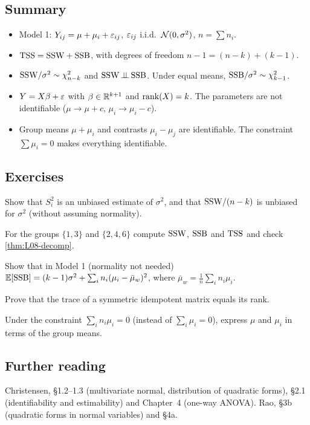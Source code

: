 \subsection{Summary}
\begin{itemize}
  \item Model 1: $Y_{ij}=\mu+\mu_i+\varepsilon_{ij}$, $\varepsilon_{ij}$ i.i.d.\ $\mathcal N(0,\sigma^2)$, $n=\sum n_i$.
  \item $\mathrm{TSS}=\mathrm{SSW}+\mathrm{SSB}$, with degrees of freedom $n-1=(n-k)+(k-1)$.
  \item $\mathrm{SSW}/\sigma^2\sim\chi^2_{n-k}$ and $\mathrm{SSW}\operatorname{\perp\!\!\!\perp}\mathrm{SSB}$. Under equal means, $\mathrm{SSB}/\sigma^2\sim\chi^2_{k-1}$.
  \item $Y=X\beta+\varepsilon$ with $\beta\in\mathbb R^{k+1}$ and $\operatorname{rank}(X)=k$. The parameters are not identifiable ($\mu\to\mu+c$, $\mu_i\to\mu_i-c$).
  \item Group means $\mu+\mu_i$ and contrasts $\mu_i-\mu_j$ are identifiable. The constraint $\sum\mu_i=0$ makes everything identifiable.
\end{itemize}

\subsection{Exercises}
\begin{problem}\label{prob:L08-1}
Show that $S_i^2$ is an unbiased estimate of $\sigma^2$, and that $\mathrm{SSW}/(n-k)$ is unbiased for $\sigma^2$ (without assuming normality).
\end{problem}
\begin{problem}\label{prob:L08-2}
For the groups $\{1,3\}$ and $\{2,4,6\}$ compute $\mathrm{SSW}$, $\mathrm{SSB}$ and $\mathrm{TSS}$ and check \cref{thm:L08-decomp}.
\end{problem}
\begin{problem}\label{prob:L08-3}
Show that in Model 1 (normality not needed) $\mathbb E[\mathrm{SSB}]=(k-1)\sigma^2+\sum_i n_i(\mu_i-\bar\mu_w)^2$, where $\bar\mu_w=\frac1n\sum_i n_i\mu_i$.
\end{problem}
\begin{problem}\label{prob:L08-4}
Prove that the trace of a symmetric idempotent matrix equals its rank.
\end{problem}
\begin{problem}\label{prob:L08-5}
Under the constraint $\sum_i n_i\mu_i=0$ (instead of $\sum_i\mu_i=0$), express $\mu$ and $\mu_i$ in terms of the group means.
\end{problem}

\subsection{Further reading}
Christensen, \S1.2--1.3 (multivariate normal, distribution of quadratic forms), \S2.1
(identifiability and estimability) and Chapter~4 (one-way ANOVA). Rao, \S3b (quadratic forms
in normal variables) and \S4a.
